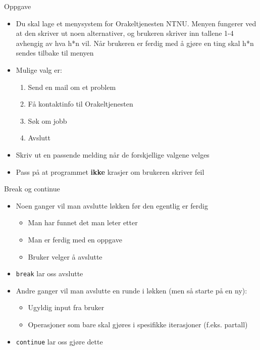\documentclass[screen, aspectratio=169]{beamer}
\begin{document}
\begin{frame}{Oppgave}
	\begin{itemize}
		\item Du skal lage et menysystem for Orakeltjenesten NTNU. Menyen fungerer ved at den skriver ut noen alternativer, og brukeren skriver inn tallene 1-4 avhengig av hva h*n vil. Når brukeren er ferdig med å gjøre en ting skal h*n sendes tilbake til menyen
		\item Mulige valg er:
		\begin{enumerate}
			\item Send en mail om et problem
			\item Få kontaktinfo til Orakeltjenesten
			\item Søk om jobb
			\item Avslutt
		\end{enumerate}
	\item Skriv ut en passende melding når de forskjellige valgene velges
	\item Pass på at programmet \textbf{ikke} krasjer om brukeren skriver feil
	\end{itemize}
\end{frame}

\begin{frame}[fragile]{Break og continue}
	\begin{itemize}
		\item Noen ganger vil man avslutte løkken før den egentlig er ferdig
		\begin{itemize}
			\item Man har funnet det man leter etter
			\item Man er ferdig med en oppgave
			\item Bruker velger å avslutte
		\end{itemize}
		\item \lstinline|break| lar oss avslutte
		\item Andre ganger vil man avslutte en runde i løkken (men så starte på en ny):
		\begin{itemize}
			\item Ugyldig input fra bruker
			\item Operasjoner som bare skal gjøres i spesifikke iterasjoner (f.eks. partall)
		\end{itemize}
		\item \lstinline|continue| lar oss gjøre dette
	\end{itemize}
\end{frame}
\end{document}
